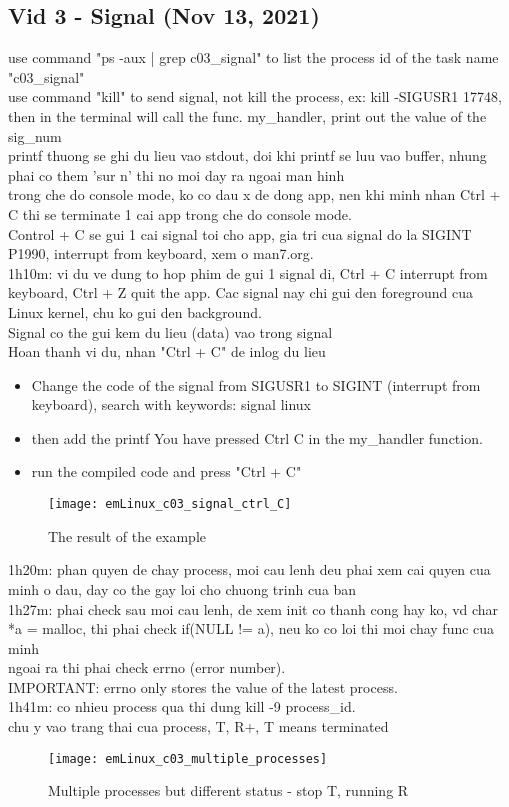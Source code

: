 \subsection{Vid 3 - Signal (Nov 13, 2021)}

use command "ps -aux | grep c03\_signal" to list the process id of the task name "c03\_signal"
\\use command "kill" to send signal, not kill the process, ex: kill -SIGUSR1 17748, then in the terminal will call the func. my\_handler, print out the value of the sig\_num
\\printf thuong se ghi du lieu vao stdout, doi khi printf se luu vao buffer, nhung phai co them 'sur n' thi no moi day ra ngoai man hinh 
\\trong che do console mode, ko co dau x de dong app, nen khi minh nhan Ctrl + C thi se terminate 1 cai app trong che do console mode.
\\Control + C se gui 1 cai signal toi cho app, gia tri cua signal do la SIGINT P1990, interrupt from keyboard, xem o man7.org.
\\1h10m: vi du ve dung to hop phim de gui 1 signal di, Ctrl + C interrupt from keyboard, Ctrl + Z quit the app. Cac signal nay chi gui den foreground cua Linux kernel, chu ko gui den background.
\\Signal co the gui kem du lieu (data) vao trong signal
\\Hoan thanh vi du, nhan "Ctrl + C" de inlog du lieu
\begin{itemize}
  \item Change the code of the signal from SIGUSR1 to SIGINT (interrupt from keyboard), search with keywords: signal linux
  \item then add the printf You have pressed Ctrl C in the my\_handler function.
  \item run the compiled code and press "Ctrl + C"
\end{itemize}

\begin{figure}[h]
  \texttt{[image: emLinux\_c03\_signal\_ctrl\_C]}
  \caption{The result of the example}  
\end{figure}



1h20m: phan quyen de chay process, moi cau lenh deu phai xem cai quyen cua minh o dau, day co the gay loi cho chuong trinh cua ban
\\1h27m: phai check sau moi cau lenh, de xem init co thanh cong hay ko, vd char *a = malloc, thi phai check if(NULL != a), neu ko co loi thi moi chay func cua minh
\\ngoai ra thi phai check errno (error number).
\\IMPORTANT: errno only stores the value of the latest process.
\\1h41m: co nhieu process qua thi dung kill -9 process\_id.
\\chu y vao trang thai cua process, T, R+, T means terminated 
\begin{figure}[h]
  \texttt{[image: emLinux\_c03\_multiple\_processes]}
  \caption{Multiple processes but different status - stop T, running R}  
\end{figure}

